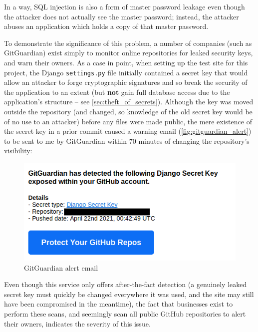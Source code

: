 \documentclass[12pt]{report}
\begin{document}
In a way, SQL injection is also a form of master password leakage even though the attacker does not actually see the master password; instead, the attacker abuses an application which holds a copy of that master password.

To demonstrate the significance of this problem, a number of companies (such as GitGuardian\cite{GitGuardian}) exist simply to monitor online repositories for leaked security keys, and warn their owners. As a case in point, when setting up the test site for this project, the Django \texttt{settings.py} file initially contained a secret key that would allow an attacker to forge cryptographic signatures and so break the security of the application to an extent (but \textbf{not} gain full database access due to the application's structure -- see \autoref{sec:theft_of_secrets}). Although the key was moved outside the repository (and changed, so knowledge of the old secret key would be of no use to an attacker) before any files were made public, the mere existence of the secret key in a prior commit caused a warning email (\autoref{fig:gitguardian_alert}) to be sent to me by GitGuardian within 70 minutes of changing the repository's visibility:

\begin{figure}[h]
  \begin{center}
    \includegraphics[scale=0.5]{01-gitguardian.png}
  \end{center}
  \caption{GitGuardian alert email}
  \label{fig:gitguardian_alert}
\end{figure}

Even though this service only offers after-the-fact detection (a genuinely leaked secret key must quickly be changed everywhere it was used, and the site may still have been compromised in the meantime), the fact that businesses exist to perform these scans, and seemingly scan all public GitHub repositories to alert their owners, indicates the severity of this issue.
\end{document}
